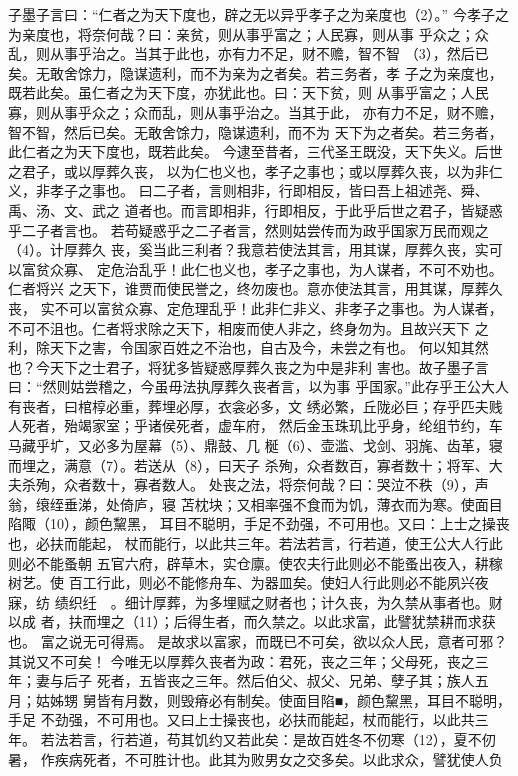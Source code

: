 \documentclass[12pt,UTF8]{ctexbook}
\begin{document}
子墨子言曰：“仁者之为天下度也，辟之无以异乎孝子之为亲度也（2）。” 
今孝子之为亲度也，将奈何哉？曰：亲贫，则从事乎富之；人民寡，则从事 
乎众之；众乱，则从事乎治之。当其于此也，亦有力不足，财不赡，智不智 
（3），然后已矣。无敢舍馀力，隐谋遗利，而不为亲为之者矣。若三务者，孝 
子之为亲度也，既若此矣。虽仁者之为天下度，亦犹此也。曰：天下贫，则 
从事乎富之；人民寡，则从事乎众之；众而乱，则从事乎治之。当其于此， 
亦有力不足，财不赡，智不智，然后已矣。无敢舍馀力，隐谋遗利，而不为 
天下为之者矣。若三务者，此仁者之为天下度也，既若此矣。 
今逮至昔者，三代圣王既没，天下失义。后世之君子，或以厚葬久丧， 
以为仁也义也，孝子之事也；或以厚葬久丧，以为非仁义，非孝子之事也。 
曰二子者，言则相非，行即相反，皆曰吾上祖述尧、舜、禹、汤、文、武之 
道者也。而言即相非，行即相反，于此乎后世之君子，皆疑惑乎二子者言也。 
若苟疑惑乎之二子者言，然则姑尝传而为政乎国家万民而观之（4）。计厚葬久 
丧，奚当此三利者？我意若使法其言，用其谋，厚葬久丧，实可以富贫众寡、 
定危治乱乎！此仁也义也，孝子之事也，为人谋者，不可不劝也。仁者将兴 
之天下，谁贾而使民誉之，终勿废也。意亦使法其言，用其谋，厚葬久丧， 
实不可以富贫众寡、定危理乱乎！此非仁非义、非孝子之事也。为人谋者， 
不可不沮也。仁者将求除之天下，相废而使人非之，终身勿为。且故兴天下 
之利，除天下之害，令国家百姓之不治也，自古及今，未尝之有也。 
何以知其然也？今天下之士君子，将犹多皆疑惑厚葬久丧之为中是非利 
害也。故子墨子言曰：“然则姑尝稽之，今虽毋法执厚葬久丧者言，以为事 
乎国家。”此存乎王公大人有丧者，曰棺椁必重，葬埋必厚，衣衾必多，文 
绣必繁，丘陇必巨；存乎匹夫贱人死者，殆竭家室；乎诸侯死者，虚车府， 
然后金玉珠玑比乎身，纶组节约，车马藏乎圹，又必多为屋幕（5）、鼎鼓、几 
梴（6）、壶滥、戈剑、羽旄、齿革，寝而埋之，满意（7）。若送从（8），曰天子 
杀殉，众者数百，寡者数十；将军、大夫杀殉，众者数十，寡者数人。 
处丧之法，将奈何哉？曰：哭泣不秩（9），声翁，缞绖垂涕，处倚庐，寝 
苫枕块；又相率强不食而为饥，薄衣而为寒。使面目陷陬（10），颜色黧黑， 
耳目不聪明，手足不劲强，不可用也。又曰：上士之操丧也，必扶而能起， 
杖而能行，以此共三年。若法若言，行若道，使王公大人行此则必不能蚤朝 
五官六府，辟草木，实仓廪。使农夫行此则必不能蚤出夜入，耕稼树艺。使 
百工行此，则必不能修舟车、为器皿矣。使妇人行此则必不能夙兴夜寐，纺 
绩织纴　。细计厚葬，为多埋赋之财者也；计久丧，为久禁从事者也。财以成 
者，扶而埋之（11）；后得生者，而久禁之。以此求富，此譬犹禁耕而求获也。 
富之说无可得焉。 
是故求以富家，而既已不可矣，欲以众人民，意者可邪？其说又不可矣！ 
今唯无以厚葬久丧者为政：君死，丧之三年；父母死，丧之三年；妻与后子 
死者，五皆丧之三年。然后伯父、叔父、兄弟、孽子其；族人五月；姑姊甥 
舅皆有月数，则毁瘠必有制矣。使面目陷■，颜色黧黑，耳目不聪明，手足 
不劲强，不可用也。又曰上士操丧也，必扶而能起，杖而能行，以此共三年。 
若法若言，行若道，苟其饥约又若此矣：是故百姓冬不仞寒（12），夏不仞暑， 
作疾病死者，不可胜计也。此其为败男女之交多矣。以此求众，譬犹使人负 
\end{document}
